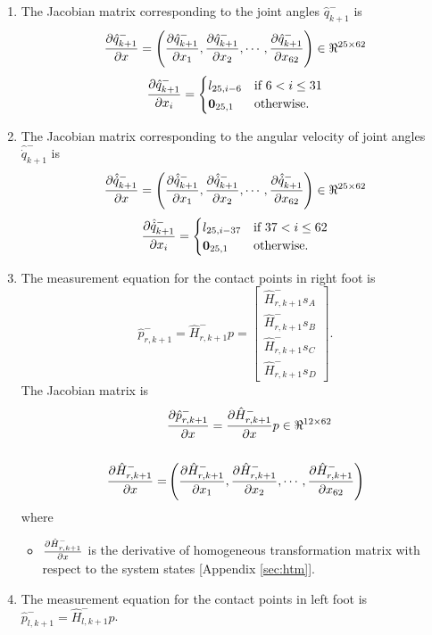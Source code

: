 \begin{enumerate}
\item The Jacobian matrix corresponding to the joint angles $\hat{q}_{k+1}^-$ is
\begin{equation}
\label{eq:dq_msrdx}
\frac{\partial {\hat{q}_{k+1}^-}}{\partial {x}} = \left(\frac{\partial {\hat{q}_{k+1}^-}}{\partial {x_{1}}}, \frac{\partial {\hat{q}_{k+1}^-}}{\partial {x_{2}}}, \cdots , \frac{\partial {\hat{q}_{k+1}^-}}{\partial {x_{62}}}\right) \in \Re^{25 \times 62}
\end{equation}
 \[
 \frac{\partial {\hat{q}_{k+1}^-}}{\partial {x_{i}}} =
 \begin{cases}
 l_{25,i-6} & \text{if } 6 < i \leq 31 \\
 \textbf{0}_{25,1} & \text{otherwise}.
 \end{cases}
 \]

\item The Jacobian matrix corresponding to the angular velocity of joint angles  $\hat{\dot{q}}_{k+1}^-$ is 
\begin{equation}
 \label{eq:ddq_msrdx}
\frac{\partial {\hat{\dot{q}}_{k+1}^-}}{\partial {x}} = \left(\frac{\partial {\hat{\dot{q}}_{k+1}^-}}{\partial {x_{1}}}, \frac{\partial {\hat{\dot{q}}_{k+1}^-}}{\partial {x_{2}}}, \cdots , \frac{\partial {\hat{\dot{q}}_{k+1}^-}}{\partial {x_{62}}}\right) \in \Re^{25 \times 62}
\end{equation}
  \[
 \frac{\partial {\hat{\dot{q}}_{k+1}^-}}{\partial {x_{i}}} =
 \begin{cases}
 l_{25,i-37} & \text{if } 37 < i \leq 62 \\
 \textbf{0}_{25,1} & \text{otherwise}.
 \end{cases}
 \]

 \item The measurement equation for the contact points in right foot is $$\hat{p}_{r,k+1}^- = \hat{H}_{r,k+1}^- p = \begin{bmatrix} \hat{H}_{r,k+1}^- s_{A}\\ \hat{H}_{r,k+1}^- s_{B}\\ \hat{H}_{r,k+1}^- s_{C}\\ \hat{H}_{r,k+1}^- s_{D}\end{bmatrix}.$$
 The Jacobian matrix is 
\begin{equation}
    \label{eq:dpr_msrdx}
    \begin{split}
    &\dfdx{\hat{p}_{r,k+1}^-}{x} = \dfdx{\hat{H}_{r,k+1}^-}{x}p\in \Re^{12 \times 62}
 \\ \vspace{1cm} \\
     \dfdx{\hat{H}_{r,k+1}^-}{x} = &\left( \dfdx{\hat{H}_{r,k+1}^-}{x_1}, \dfdx{\hat{H}_{r,k+1}^-}{x_2},\cdots, \dfdx{\hat{H}_{r,k+1}^-}{x_{62}} \right)     
     \end{split}
\end{equation}where
\begin{itemize}
     \item $\frac{\partial {\hat{H}_{r,k+1}^-}}{\partial {x}}$ is the derivative of homogeneous transformation matrix with respect to the system states [Appendix \ref{sec:htm}].
\end{itemize}
 \item The measurement equation for the contact points in left foot is  $\hat{p}_{l,k+1}^- = \hat{H}_{l,k+1}^- p$.


\end{enumerate}
